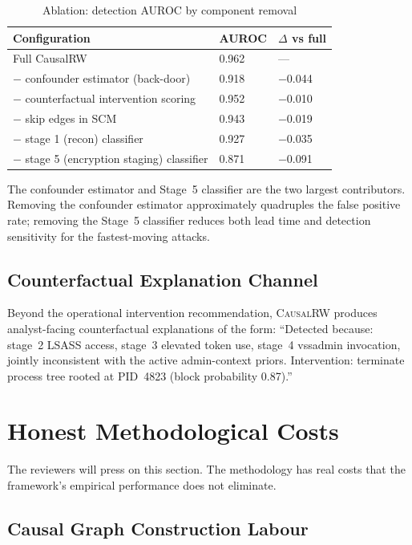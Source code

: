 \documentclass[sigconf,nonacm]{acmart}
\begin{document}
\begin{table}[h]
\caption{Ablation: detection AUROC by component removal}
\label{tab:ablation}
\small
\begin{tabularx}{\columnwidth}{@{}Xp{1.0cm}p{1.2cm}@{}}
\toprule
\textbf{Configuration} & \textbf{AUROC} & \textbf{$\Delta$ vs full} \\
\midrule
Full CausalRW                                  & 0.962 & --- \\
$-$ confounder estimator (back-door)           & 0.918 & $-$0.044 \\
$-$ counterfactual intervention scoring        & 0.952 & $-$0.010 \\
$-$ skip edges in SCM                          & 0.943 & $-$0.019 \\
$-$ stage 1 (recon) classifier                 & 0.927 & $-$0.035 \\
$-$ stage 5 (encryption staging) classifier    & 0.871 & $-$0.091 \\
\bottomrule
\end{tabularx}
\end{table}

The confounder estimator and Stage~5 classifier are the two largest
contributors. Removing the confounder estimator approximately
quadruples the false positive rate; removing the Stage~5 classifier
reduces both lead time and detection sensitivity for the
fastest-moving attacks.

\subsection{Counterfactual Explanation Channel}

Beyond the operational intervention recommendation, \textsc{CausalRW}
produces analyst-facing counterfactual explanations of the form:
``Detected because: stage~2 LSASS access, stage~3 elevated token use,
stage~4 vssadmin invocation, jointly inconsistent with the active
admin-context priors. Intervention: terminate process tree rooted at
PID~4823 (block probability 0.87).''

\section{Honest Methodological Costs}

The reviewers will press on this section. The methodology has real
costs that the framework's empirical performance does not eliminate.

\subsection{Causal Graph Construction Labour}
\end{document}
